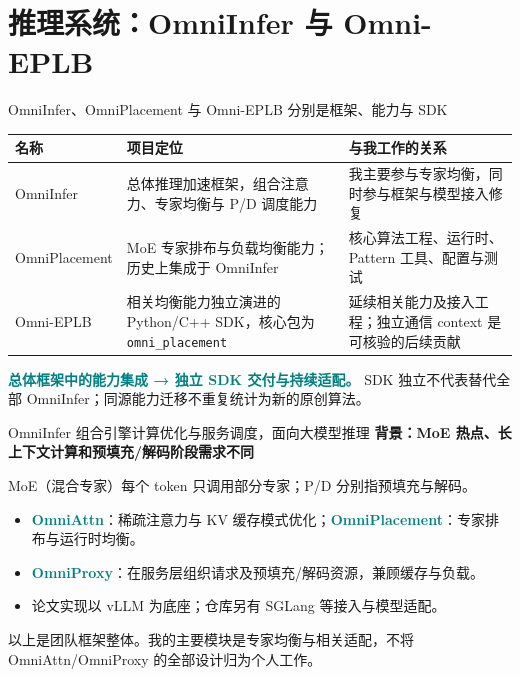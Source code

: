 \documentclass[aspectratio=169,10pt]{beamer}
\newcommand{\src}[1]{\vfill{\fontsize{6.7}{8}\selectfont\color{Muted}#1}\par}
\newcommand{\lead}[1]{{\color{Teal}\large\bfseries #1}\par\medskip}
\newcommand{\term}[1]{\textcolor{Teal}{\textbf{#1}}}
\begin{document}
\section{推理系统：OmniInfer 与 Omni-EPLB}
\begin{frame}{OmniInfer、OmniPlacement 与 Omni-EPLB 分别是框架、能力与 SDK}
\renewcommand{\arraystretch}{1.7}
\begin{tabularx}{\textwidth}{@{}p{3cm}YY@{}}
\toprule 名称 & 项目定位 & 与我工作的关系 \\
\midrule
OmniInfer & 总体推理加速框架，组合注意力、专家均衡与 P/D 调度能力 & 我主要参与专家均衡，同时参与框架与模型接入修复 \\
OmniPlacement & MoE 专家排布与负载均衡能力；历史上集成于 OmniInfer & 核心算法工程、运行时、Pattern 工具、配置与测试 \\
Omni-EPLB & 相关均衡能力独立演进的 Python/C++ SDK，核心包为 \texttt{omni\_placement} & 延续相关能力及接入工程；独立通信 context 是可核验的后续贡献 \\
\bottomrule
\end{tabularx}
\medskip
\term{总体框架中的能力集成 → 独立 SDK 交付与持续适配。}
\src{SDK 独立不代表替代全部 OmniInfer；同源能力迁移不重复统计为新的原创算法。}
\end{frame}

\begin{frame}{OmniInfer 组合引擎计算优化与服务调度，面向大模型推理}
\lead{背景：MoE 热点、长上下文计算和预填充/解码阶段需求不同}
{\small MoE（混合专家）每个 token 只调用部分专家；P/D 分别指预填充与解码。}\par
\begin{center}
\end{center}
\begin{itemize}
\item \term{OmniAttn}：稀疏注意力与 KV 缓存模式优化；\term{OmniPlacement}：专家排布与运行时均衡。
\item \term{OmniProxy}：在服务层组织请求及预填充/解码资源，兼顾缓存与负载。
\item 论文实现以 vLLM 为底座；仓库另有 SGLang 等接入与模型适配。
\end{itemize}
\src{以上是团队框架整体。我的主要模块是专家均衡与相关适配，不将 OmniAttn/OmniProxy 的全部设计归为个人工作。}
\end{frame}
\end{document}
